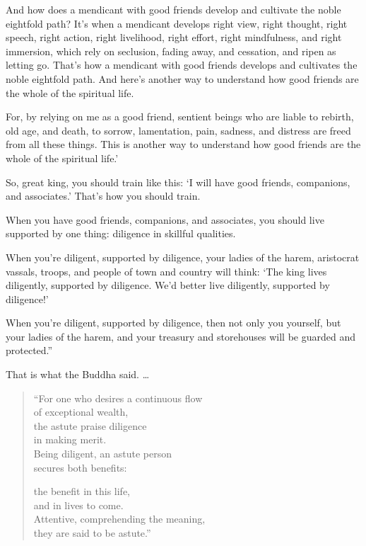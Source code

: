 \documentclass[12pt,openany]{book}%
\begin{document}
And how does a mendicant with good friends develop and cultivate the noble eightfold path? It’s when a mendicant develops right view, right thought, right speech, right action, right livelihood, right effort, right mindfulness, and right immersion, which rely on seclusion, fading away, and cessation, and ripen as letting go. That’s how a mendicant with good friends develops and cultivates the noble eightfold path. And here’s another way to understand how good friends are the whole of the spiritual life. 

For, by relying on me as a good friend, sentient beings who are liable to rebirth, old age, and death, to sorrow, lamentation, pain, sadness, and distress are freed from all these things. This is another way to understand how good friends are the whole of the spiritual life.’ 

So, great king, you should train like this: ‘I will have good friends, companions, and associates.’ That’s how you should train. 

When you have good friends, companions, and associates, you should live supported by one thing: diligence in skillful qualities. 

When you’re diligent, supported by diligence, your ladies of the harem, aristocrat vassals, troops, and people of town and country will think: ‘The king lives diligently, supported by diligence. We’d better live diligently, supported by diligence!’ 

When you’re diligent, supported by diligence, then not only you yourself, but your ladies of the harem, and your treasury and storehouses will be guarded and protected.” 

That is what the Buddha said. … 

\begin{verse}%
“For one who desires a continuous flow \\
of exceptional wealth, \\
the astute praise diligence \\
in making merit. \\
Being diligent, an astute person \\
secures both benefits: 

the benefit in this life, \\
and in lives to come. \\
Attentive, comprehending the meaning, \\
they are said to be astute.” 

%
\end{verse}
\end{document}
